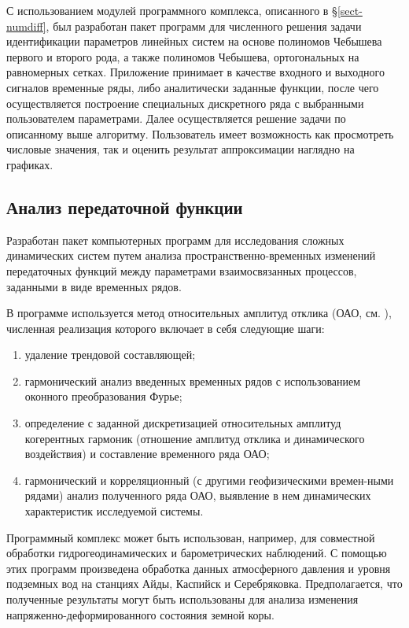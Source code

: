 С использованием модулей программного комплекса, описанного в \S\ref{sect-numdiff}, был разработан пакет программ для численного решения задачи идентификации параметров линейных систем на основе полиномов Чебышева первого и второго рода, а также полиномов Чебышева, ортогональных  на равномерных сетках. Приложение принимает в качестве входного и выходного сигналов временные ряды, либо аналитически заданные функции, после чего осуществляется построение специальных дискретного ряда с выбранными пользователем параметрами. Далее осуществляется решение задачи по описанному выше алгоритму. Пользователь имеет возможность как просмотреть числовые значения, так и оценить результат аппроксимации наглядно на графиках.



\subsection{Анализ передаточной функции}

Разработан пакет компьютерных программ для исследования сложных динамических систем путем анализа пространственно-временных изменений передаточных функций между параметрами взаимосвязанных процессов, заданными в виде временных рядов.

В программе используется метод относительных амплитуд отклика (ОАО, см. \cite{taimazov}), численная реализация которого включает в себя следующие шаги:
\begin{enumerate}[1) ]
\item
удаление трендовой составляющей;
\item
гармонический анализ введенных временных рядов с использованием оконного преобразования Фурье;
\item
определение с заданной дискретизацией относительных амплитуд когерентных гармоник (отношение амплитуд отклика и динамического воздействия) и составление временного ряда ОАО;
\item
гармонический и корреляционный (с другими геофизическими времен-ными рядами) анализ полученного ряда ОАО, выявление в нем динамических характеристик исследуемой системы.
\end{enumerate}

Программный комплекс может быть использован, например, для совместной обработки гидрогеодинамических и барометрических наблюдений.
С помощью этих программ произведена обработка данных атмосферного давления и уровня подземных вод на станциях Айды, Каспийск и Серебряковка. Предполагается, что полученные результаты могут быть использованы для анализа изменения напряженно-деформированного состояния земной коры.

